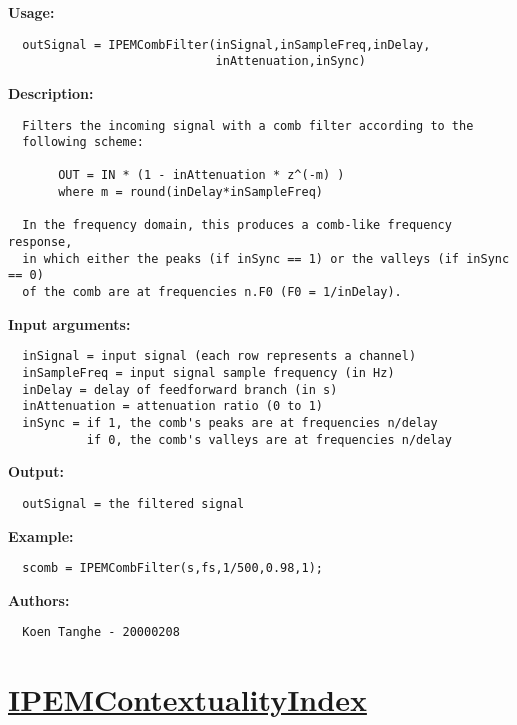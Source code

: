 \textbf{Usage:}
\begin{verbatim}  outSignal = IPEMCombFilter(inSignal,inSampleFreq,inDelay,
                             inAttenuation,inSync)

\end{verbatim}
\textbf{Description:}
\begin{verbatim}  Filters the incoming signal with a comb filter according to the
  following scheme:

       OUT = IN * (1 - inAttenuation * z^(-m) )
       where m = round(inDelay*inSampleFreq)

  In the frequency domain, this produces a comb-like frequency response,
  in which either the peaks (if inSync == 1) or the valleys (if inSync == 0)
  of the comb are at frequencies n.F0 (F0 = 1/inDelay).

\end{verbatim}
\textbf{Input arguments:}
\begin{verbatim}  inSignal = input signal (each row represents a channel)
  inSampleFreq = input signal sample frequency (in Hz)
  inDelay = delay of feedforward branch (in s)
  inAttenuation = attenuation ratio (0 to 1)
  inSync = if 1, the comb's peaks are at frequencies n/delay
           if 0, the comb's valleys are at frequencies n/delay

\end{verbatim}
\textbf{Output:}
\begin{verbatim}  outSignal = the filtered signal

\end{verbatim}
\textbf{Example:}
\begin{verbatim}  scomb = IPEMCombFilter(s,fs,1/500,0.98,1);

\end{verbatim}
\textbf{Authors:}
\begin{verbatim}  Koen Tanghe - 20000208
\end{verbatim}


\newpage
\section*{\hyperlink{Concepts:IPEMContextualityIndex}{IPEMContextualityIndex}}
\hypertarget{FuncRef:IPEMContextualityIndex}{}

